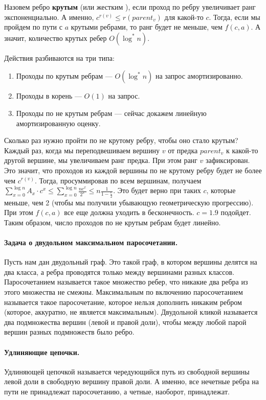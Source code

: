 \documentclass[12pt]{article}
\newcommand{\rangesum}[2]{\displaystyle \sum_{#1}^{#2}}
\begin{document}
Назовем ребро \textbf{крутым} (или жестким ), если проход по ребру увеличивает ранг экспоненциально. А именно, $c^{r(v)} \le r(parent_v)$ для какой-то $c$. Тогда, если мы пройдем по пути с $a$ крутыми ребрами, то ранг будет не меньше, чем $f(c, a)$. А значит, количество крутых ребер $O(\log^* n)$.

Действия разбиваются на три типа: 

\begin{enumerate}
\item Проходы по крутым ребрам --- $O(\log^* n)$ на запрос амортизированно.
\item Проходы в корень --- $O(1)$ на запрос.
\item Проходы по не крутым ребрам --- сейчас докажем линейную амортизированную оценку.
\end{enumerate}

Сколько раз нужно пройти по не крутому ребру, чтобы оно стало крутым? Каждый раз, когда мы переподвешиваем вершину $v$ от предка $parent_v$ к какой-то другой вершине, мы увеличиваем ранг предка. При этом ранг $v$ зафиксирован. Это значит, что проходов из каждой вершины по не крутому ребру будет не более чем $c^{r(v)}$. Тогда, просуммировав по всем вершинам, получаем $\rangesum{x=0}{\log n} A_x \cdot c^x \le \rangesum{x=0}{\log n} \frac{n c^x}{2^x} \le n \frac{1}{1 - \frac{c}{2}}$. Это будет верно при таких $c$, которые меньше, чем 2 (чтобы мы получили убывающую геометрическую прогрессию). При этом $f(c, a)$ все еще должна уходить в бесконечность. $c = 1.9$ подойдет. Таким образом, число проходов по не крутым ребрам будет линейно.

\paragraph{Задача о двудольном максимальном паросочетании.} Пусть нам дан двудольный граф. Это такой граф, в котором вершины делятся на два класса, а ребра проводятся только между вершинами разных классов. Паросочетанием называется такое множество ребер, что никакие два ребра из этого множества не смежны. Максимальным по включению паросочетанием называется такое паросочетание, которое нельзя дополнить никаким ребром (которое, аккуратно, не является максимальным). Двудольной кликой называется два подмножества вершин (левой и правой доли), чтобы между любой парой вершин разных подмножеств было ребро.

\paragraph{Удлиняющие цепочки.} Удлиняющей цепочкой называется чередующийся путь из свободной вершины левой доли в свободную вершину правой доли. А именно, все нечетные ребра на пути не принадлежат паросочетанию, а четные, наоборот, принадлежат.
\end{document}
